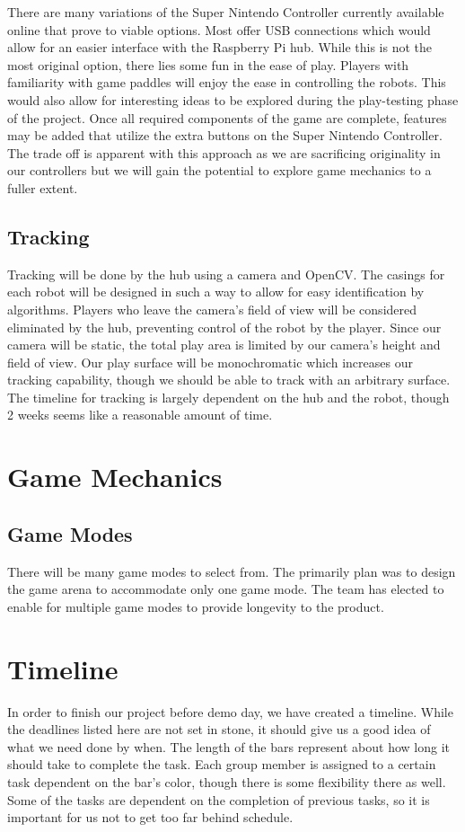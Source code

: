 \documentclass[11pt]{ieeeconf}
\begin{document}
There are many variations of the Super Nintendo Controller currently available online that prove to viable options. Most offer USB connections which would allow for an easier interface with the Raspberry Pi hub. While this is not the most original option, there lies some fun in the ease of play. Players with familiarity with game paddles will enjoy the ease in controlling the robots. This would also allow for interesting ideas to be explored during the play-testing phase of the project. Once all required components of the game are complete, features may be added that utilize the extra buttons on the Super Nintendo Controller. The trade off is apparent with this approach as we are sacrificing originality in our controllers but we will gain the potential to explore game mechanics to a fuller extent. 

\subsection{Tracking}

Tracking will be done by the hub using a camera and OpenCV. The casings for each robot will be designed in such a way to allow for easy identification by algorithms. Players who leave the camera's field of view will be considered eliminated by the hub, preventing control of the robot by the player. Since our camera will be static, the total play area is limited by our camera's height and field of view. Our play surface will be monochromatic which increases our tracking capability, though we should be able to track with an arbitrary surface. The timeline for tracking is largely dependent on the hub and the robot, though 2 weeks seems like a reasonable amount of time.

\section{Game Mechanics}

\subsection{Game Modes}

There will be many game modes to select from. The primarily plan was to design the game arena to accommodate only one game mode. The team has elected to enable for multiple game modes to provide longevity to the product.    

\section{Timeline}
In order to finish our project before demo day, we have created a timeline. While the deadlines listed here are not set in stone, it should give us a good idea of what we need done by when. The length of the bars represent about how long it should take to complete the task. Each group member is assigned to a certain task dependent on the bar's color, though there is some flexibility there as well. Some of the tasks are dependent on the completion of previous tasks, so it is important for us not to get too far behind schedule. 
\end{document}
